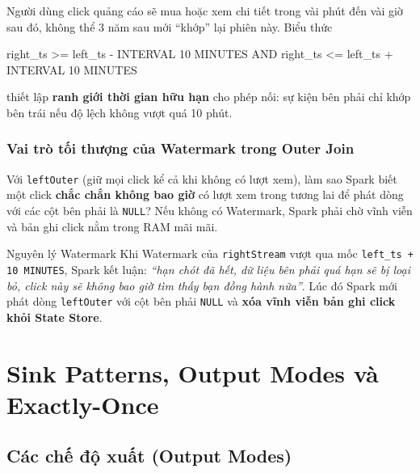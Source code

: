 \documentclass[12pt]{article}
\begin{document}
Người dùng click quảng cáo sẽ mua hoặc xem chi tiết trong vài phút đến vài giờ sau đó, không thể 3 năm sau mới ``khớp'' lại phiên này. Biểu thức

\begin{aivnsqlbox}
right_ts >= left_ts - INTERVAL 10 MINUTES AND right_ts <= left_ts + INTERVAL 10 MINUTES
\end{aivnsqlbox}

thiết lập \textbf{ranh giới thời gian hữu hạn} cho phép nối: sự kiện bên phải chỉ khớp bên trái nếu độ lệch không vượt quá 10 phút.

\subsubsection{Vai trò tối thượng của Watermark trong Outer Join}

Với \texttt{leftOuter} (giữ mọi click kể cả khi không có lượt xem), làm sao Spark biết một click \textbf{chắc chắn không bao giờ} có lượt xem trong tương lai để phát dòng với các cột bên phải là \texttt{NULL}? Nếu không có Watermark, Spark phải chờ vĩnh viễn và bản ghi click nằm trong RAM mãi mãi.

\begin{infobox}{Nguyên lý Watermark}
Khi Watermark của \texttt{rightStream} vượt qua mốc \texttt{left\_ts + 10 MINUTES}, Spark kết luận: \textit{``hạn chót đã hết, dữ liệu bên phải quá hạn sẽ bị loại bỏ, click này sẽ không bao giờ tìm thấy bạn đồng hành nữa''}. Lúc đó Spark mới phát dòng \texttt{leftOuter} với cột bên phải \texttt{NULL} và \textbf{xóa vĩnh viễn bản ghi click khỏi State Store}.
\end{infobox}

\section{Sink Patterns, Output Modes và Exactly-Once}
\label{sec:sink}

\subsection{Các chế độ xuất (Output Modes)}
\end{document}
